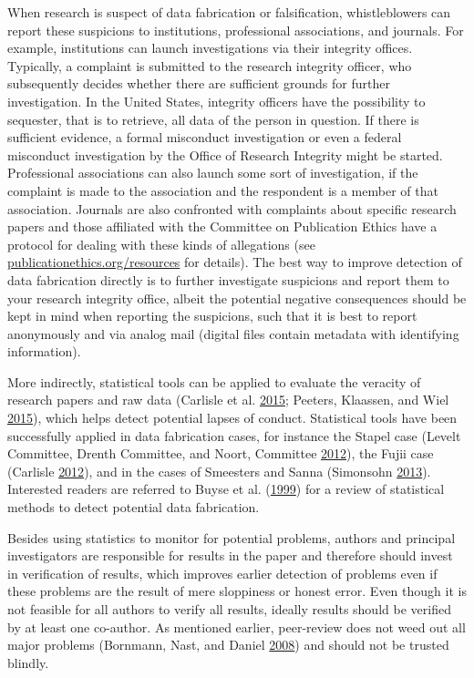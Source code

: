 \documentclass[a5paper]{book}
\begin{document}
When research is suspect of data fabrication or falsification,
whistleblowers can report these suspicions to institutions, professional
associations, and journals. For example, institutions can launch
investigations via their integrity offices. Typically, a complaint is
submitted to the research integrity officer, who subsequently decides
whether there are sufficient grounds for further investigation. In the
United States, integrity officers have the possibility to sequester,
that is to retrieve, all data of the person in question. If there is
sufficient evidence, a formal misconduct investigation or even a federal
misconduct investigation by the Office of Research Integrity might be
started. Professional associations can also launch some sort of
investigation, if the complaint is made to the association and the
respondent is a member of that association. Journals are also confronted
with complaints about specific research papers and those affiliated with
the Committee on Publication Ethics have a protocol for dealing with
these kinds of allegations (see
\href{https://publicationethics.org/resources}{publicationethics.org/resources}
for details). The best way to improve detection of data fabrication
directly is to further investigate suspicions and report them to your
research integrity office, albeit the potential negative consequences
should be kept in mind when reporting the suspicions, such that it is
best to report anonymously and via analog mail (digital files contain
metadata with identifying information).

More indirectly, statistical tools can be applied to evaluate the
veracity of research papers and raw data (Carlisle et al.
\protect\hyperlink{ref-doi:10.1111ux2fanae.13126}{2015}; Peeters,
Klaassen, and Wiel \protect\hyperlink{ref-peeters2015}{2015}), which
helps detect potential lapses of conduct. Statistical tools have been
successfully applied in data fabrication cases, for instance the Stapel
case (Levelt Committee, Drenth Committee, and Noort, Committee
\protect\hyperlink{ref-levelt2012}{2012}), the Fujii case (Carlisle
\protect\hyperlink{ref-doi:10.1111ux2fj.1365-2044.2012.07128.x}{2012}),
and in the cases of Smeesters and Sanna (Simonsohn
\protect\hyperlink{ref-doi:10.1177ux2f0956797613480366}{2013}).
Interested readers are referred to Buyse et al.
(\protect\hyperlink{ref-buyse1999}{1999}) for a review of statistical
methods to detect potential data fabrication.

Besides using statistics to monitor for potential problems, authors and
principal investigators are responsible for results in the paper and
therefore should invest in verification of results, which improves
earlier detection of problems even if these problems are the result of
mere sloppiness or honest error. Even though it is not feasible for all
authors to verify all results, ideally results should be verified by at
least one co-author. As mentioned earlier, peer-review does not weed out
all major problems (Bornmann, Nast, and Daniel
\protect\hyperlink{ref-doi:10.1007ux2fs11192-007-1950-2}{2008}) and
should not be trusted blindly.
\end{document}
